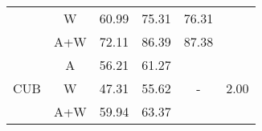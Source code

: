 \documentclass{article}
\begin{document}
\begin{table*}[]
\begin{tabular}{c|c|c|c|c|c}
                     & W                                                                          & 60.99                                                                          & 75.31                                                                             & 76.31                                                                                 &                                                                                                                                                                   \\ \cline{2-5}
                     & A+W                                                                        & 72.11                                                                          & 86.39                                                                             & 87.38                                                                                 &                                                                                                                                                                   \\ \hline
\multirow{3}{*}{CUB} & A                                                                          & 56.21                                                                          & 61.27                                                                             & \multirow{3}{*}{-}                                                                    & \multirow{3}{*}{2.00}                                                                                                                       \\ \cline{2-4}
                     & W                                                                          & 47.31                                                                          & 55.62                                                                             &                                                                                       &                                                                                                                                                                   \\ \cline{2-4}
                     & A+W                                                                        & 59.94                                                                          & 63.37                                                                             &                                                                                       &                                                                                                                                                                  \\ \hline

\end{tabular}
\end{table*}
\end{document}
